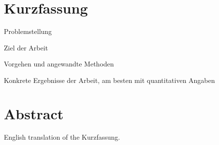 \chapter*{Kurzfassung} %

Problemstellung

Ziel der Arbeit

Vorgehen und angewandte Methoden

Konkrete Ergebnisse der Arbeit, am besten mit quantitativen Angaben

\clearpage

\chapter*{Abstract} %

English translation of the \glqq Kurzfassung\grqq.

\clearpage